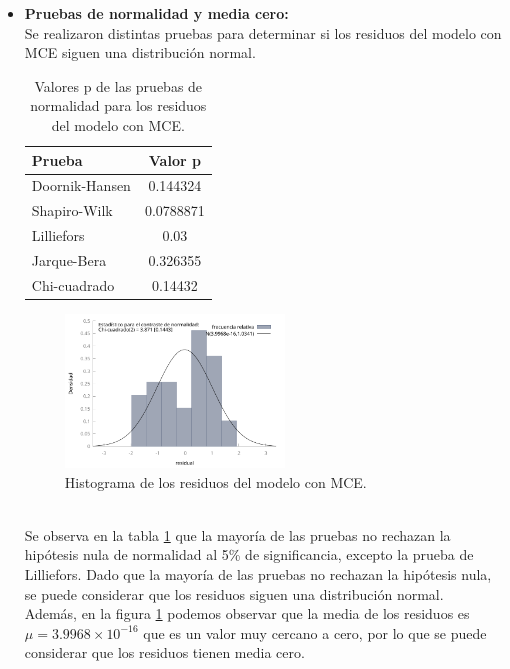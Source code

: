 \documentclass[12pt]{article}
\begin{document}
\begin{itemize}
    \item \textbf{Pruebas de normalidad y media cero:}\\
    Se realizaron distintas pruebas para determinar si los residuos del modelo con MCE siguen una distribución normal.\\
    \begin{table}[h!]
    \centering
    \begin{tabular}{lc}
        \toprule
        Prueba & Valor p \\
        \midrule
        Doornik-Hansen & 0.144324 \\
        Shapiro-Wilk & 0.0788871 \\
        Lilliefors & 0.03 \\
        Jarque-Bera & 0.326355 \\
        Chi-cuadrado & 0.14432 \\
        \bottomrule
    \end{tabular}
    \caption{Valores p de las pruebas de normalidad para los residuos del modelo con MCE.} 
    \label{tab:residuos_normalidad}
    \end{table}
    \begin{figure}[h!]
        \centering
        \includegraphics[width=0.55\textwidth]{imagenes/hist_res.pdf}
        \caption{Histograma de los residuos del modelo con MCE.}
        \label{fig:residuos_hist}
    \end{figure}\\
    Se observa en la tabla \ref{tab:residuos_normalidad} que la mayoría de las pruebas no 
    rechazan la hipótesis nula de normalidad al 5\% de significancia, excepto la prueba de Lilliefors.
    Dado que la mayoría de las pruebas no rechazan la hipótesis nula, se puede considerar que los residuos 
    siguen una distribución normal.\\
    Además, en la figura \ref{fig:residuos_hist} podemos observar que la media de los residuos es
    $\mu = 3.9968 \times 10^{-16}$ que es un valor muy cercano a cero, por lo que se puede considerar que los residuos
    tienen media cero.


\end{itemize}
\end{document}
